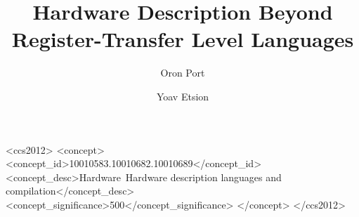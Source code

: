 \documentclass[sigconf]{acmart}
\begin{document}
\graphicspath{{./graphics/}}


\title{Hardware Description Beyond Register-Transfer Level Languages}


\author{Oron Port}

\author{Yoav Etsion}




 \begin{CCSXML}
	<ccs2012>
	<concept>
	<concept_id>10010583.10010682.10010689</concept_id>
	<concept_desc>Hardware~Hardware description languages and compilation</concept_desc>
	<concept_significance>500</concept_significance>
	</concept>
	</ccs2012>
\end{CCSXML}
\end{document}
